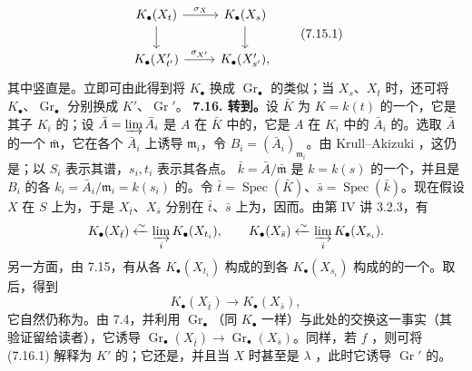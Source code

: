 \[\begin{tikzcd}K_\bullet(X_t)\arrow[r,"\sigma_X"]\arrow[d]&K_\bullet(X_s)\arrow[d]\\K_\bullet(X'_{t'})\arrow[r,"\sigma_{X'}"]&K_\bullet(X'_{s'}),\end{tikzcd}\tag{7.15.1}\]
其中竖直是。立即可由此得到将 $K_\bullet$ 换成 $\operatorname{Gr}_\bullet$ 的类似；当 $X_s$、$X_t$ 时，还可将 $K_\bullet$、$\operatorname{Gr}_\bullet$ 分别换成 $K'$、$\operatorname{Gr}'$。
\textbf{7.16. 转到。}设 $\bar K$ 为 $K=k(t)$ 的一个，它是其子 $K_i$ 的；设 $\bar A=\varinjlim\bar A_i$ 是 $A$ 在 $\bar K$ 中的，它是 $A$ 在 $K_i$ 中的 $\bar A_i$ 的。选取 $\bar A$ 的一个 $\bar{\mathfrak m}$，它在各个 $\bar A_i$ 上诱导 $\mathfrak m_i$，令 $B_i=(\bar A_i)_{\mathfrak m_i}$。由 Krull--Akizuki ，这仍是；以 $S_i$ 表示其谱，$s_i,t_i$ 表示其各点。 $\bar k=\bar A/\bar{\mathfrak m}$ 是 $k=k(s)$ 的一个，并且是 $B_i$ 的各 $k_i=\bar A_i/\mathfrak m_i=k(s_i)$ 的。令 $\bar t=\operatorname{Spec}(\bar K)$、$\bar s=\operatorname{Spec}(\bar k)$。现在假设 $X$ 在 $S$ 上为，于是 $X_{\bar t}$、$X_{\bar s}$ 分别在 $\bar t$、$\bar s$ 上为，因而。由第 IV 讲 3.2.3，有
\[K_\bullet(X_{\bar t})\xleftarrow{\sim}\varinjlim_i K_\bullet(X_{t_i}),\qquad K_\bullet(X_{\bar s})\xleftarrow{\sim}\varinjlim_i K_\bullet(X_{s_i}).\]
另一方面，由 7.15，有从各 $K_\bullet(X_{t_i})$ 构成的到各 $K_\bullet(X_{s_i})$ 构成的的一个。取后，得到
\[K_\bullet(X_{\bar t})\longrightarrow K_\bullet(X_{\bar s}),\tag{7.16.1}\]
它自然仍称为。由 7.4，并利用 $\operatorname{Gr}_\bullet$（同 $K_\bullet$ 一样）与此处的交换这一事实（其验证留给读者），它诱导 $\operatorname{Gr}_\bullet(X_{\bar t})\to\operatorname{Gr}_\bullet(X_{\bar s})$。同样，若 $f$ ，则可将 (7.16.1) 解释为 $K'$ 的；它还是，并且当 $X$ 时甚至是 $\lambda$ ，此时它诱导 $\operatorname{Gr}'$ 的。
